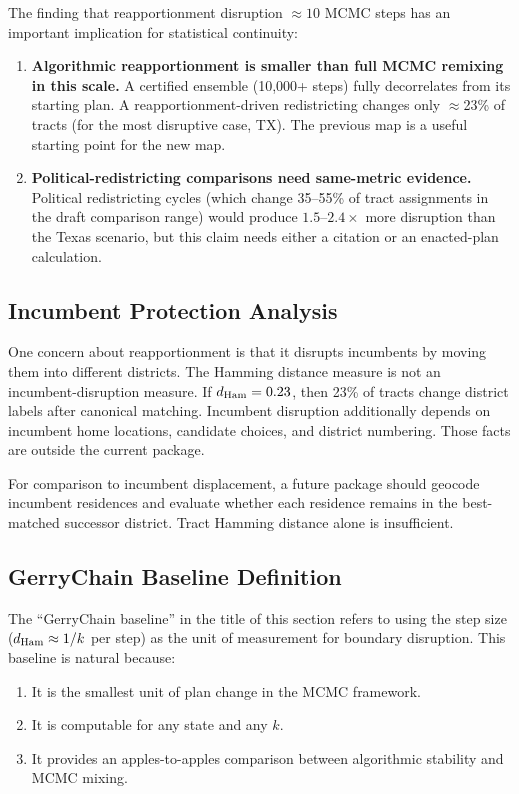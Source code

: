 The finding that reapportionment disruption $\approx 10$ MCMC steps
has an important implication for statistical continuity:

\begin{enumerate}
\item \textbf{Algorithmic reapportionment is smaller than full MCMC remixing in this scale.}
      A certified \recom{} ensemble (10{,}000+ steps) fully decorrelates
      from its starting plan.
      A reapportionment-driven redistricting changes only $\approx$23\% of
      tracts (for the most disruptive case, TX).
      The previous map is a useful starting point for the new map.
\item \textbf{Political-redistricting comparisons need same-metric evidence.}
      Political redistricting cycles (which change 35--55\% of tract
      assignments in the draft comparison range) would produce
      $1.5$--$2.4\times$ more disruption than the Texas scenario, but this
      claim needs either a citation or an enacted-plan calculation.
\end{enumerate}

\subsection{Incumbent Protection Analysis}

One concern about reapportionment is that it disrupts incumbents by
moving them into different districts.
The Hamming distance measure is not an incumbent-disruption measure.
If $d_{\rm Ham} = 0.23$, then 23\% of tracts change district labels after
canonical matching.  Incumbent disruption additionally depends on incumbent
home locations, candidate choices, and district numbering.  Those facts are
outside the current package.

For comparison to incumbent displacement, a future package should geocode
incumbent residences and evaluate whether each residence remains in the
best-matched successor district.  Tract Hamming distance alone is insufficient.

\subsection{GerryChain Baseline Definition}

The ``GerryChain baseline'' in the title of this section refers to using
the \recom{} step size ($d_{\rm Ham} \approx 1/k$ per step) as the unit
of measurement for boundary disruption.
This baseline is natural because:
\begin{enumerate}
\item It is the smallest unit of plan change in the MCMC framework.
\item It is computable for any state and any $k$.
\item It provides an apples-to-apples comparison between algorithmic
      stability and MCMC mixing.
\end{enumerate}

